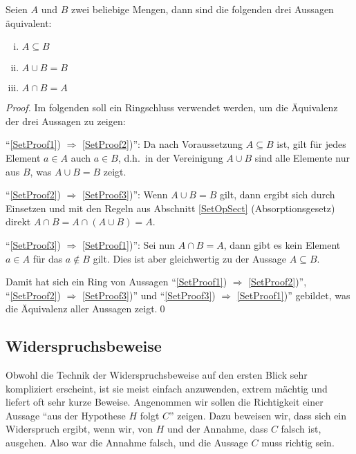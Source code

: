 \goodbreak
\begin{theorem}
\label{SetProof}
Seien $A$ und $B$ zwei beliebige Mengen, dann sind die folgenden drei
Aussagen äquivalent:
\begin{enumerate}[i)]
%
\item\label{SetProof1} $A \subseteq B$
%
\item\label{SetProof2} $A \cup B = B$
%
\item\label{SetProof3} $A \cap B = A$
%
\end{enumerate}
\end{theorem}

\begin{proof}
Im folgenden soll ein Ringschluss verwendet werden, um die Äquivalenz
der drei Aussagen zu zeigen:

\noindent "`\ref{SetProof1}) $\Rightarrow$ \ref{SetProof2})"': Da nach
Voraussetzung $A \subseteq B$ ist, gilt für jedes Element $a \in A$
auch $a \in B$, d.h.~in der Vereinigung $A \cup B$ sind alle Elemente
nur aus $B$, was $A \cup B = B$ zeigt.

\medskip

\noindent "`\ref{SetProof2}) $\Rightarrow$ \ref{SetProof3})"': Wenn
$A \cup B = B$ gilt, dann ergibt sich durch Einsetzen und mit den
Regeln aus Abschnitt \ref{SetOpSect} (Absorptionsgesetz) direkt
$A \cap B = A \cap (A \cup B) = A$.

\medskip

\noindent "`\ref{SetProof3}) $\Rightarrow$ \ref{SetProof1})"': Sei
nun $A \cap B = A$, dann gibt es kein Element $a \in A$ für das
$a \not\in B$ gilt. Dies ist aber gleichwertig zu der Aussage
$A \subseteq B$. 

Damit hat sich ein Ring von Aussagen "`\ref{SetProof1})
$\Rightarrow$ \ref{SetProof2})"', "`\ref{SetProof2})
$\Rightarrow$ \ref{SetProof3})"' und "`\ref{SetProof3})
$\Rightarrow$ \ref{SetProof1})"' gebildet, was die Äquivalenz aller
Aussagen zeigt.\qed
\end{proof}

\subsection{Widerspruchsbeweise}
\label{IndirektBeweis}
Obwohl die Technik der
Widerspruchsbeweise
auf den ersten Blick sehr kompliziert erscheint, ist sie meist einfach
anzuwenden, extrem mächtig und liefert oft sehr kurze
Beweise. Angenommen wir sollen die Richtigkeit einer Aussage "`aus der
Hypothese $H$ folgt $C$"' zeigen. Dazu beweisen wir, dass sich ein
Widerspruch ergibt, wenn wir, von $H$ und der Annahme, dass $C$ falsch
ist, ausgehen. Also war die Annahme falsch, und die Aussage $C$ muss
richtig sein.

